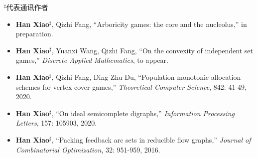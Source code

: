 %
%


$^\sharp$代表通讯作者
\begin{itemize}
	\item \textbf{Han Xiao}$^\sharp$, Qizhi Fang, ``Arboricity games: the core and the nucleolus,'' in preparation.\\
	 { \footnotesize {}}
	\item \textbf{Han Xiao}$^\sharp$, Yuanxi Wang, Qizhi Fang, ``On the convexity of independent set games,''
	\emph{Discrete Applied Mathematics}, to appear.\\
	 { \footnotesize {}}
	\item \textbf{Han Xiao}$^\sharp$, Qizhi Fang, Ding-Zhu Du, ``Population monotonic allocation schemes for vertex cover games,''
	\emph{Theoretical Computer Science}, 842: 41-49, 2020.\\
	 { \footnotesize {}}
	 \item \textbf{Han Xiao}$^\sharp$, ``On ideal semicomplete digraphs,''
	\emph{Information Processing Letters}, 157: 105903, 2020.\\
	 { \footnotesize {}}
	\item \textbf{Han Xiao}$^\sharp$, ``Packing feedback arc sets in reducible flow graphs,''
	\emph{Journal of Combinatorial Optimization}, 32: 951-959, 2016.\\
	 { \footnotesize {}}
\end{itemize}